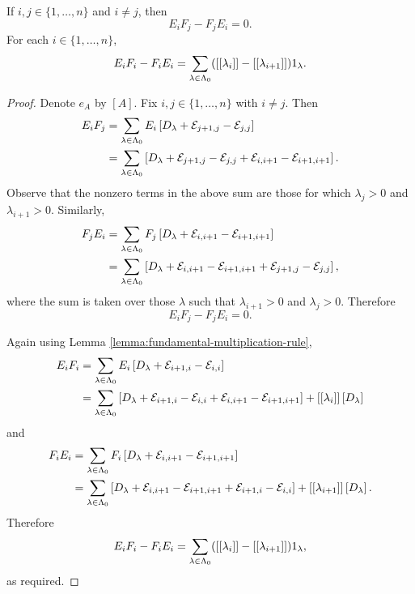 \documentclass[a4paper, 11pt]{report}
\begin{document}
\begin{lemma}\label{lemma:q-commutators-E-F}
If $i,j\in\{1,\ldots,n\}$ and $i\neq j$, then
\begin{equation*}
E_iF_j - F_jE_i = 0.
\end{equation*}
For each $i\in\{1,\ldots,n\}$,
\begin{equation*}
E_iF_i - F_iE_i = \sum_{\lambda\in\Lambda_0{}} ([[\lambda_i]] - [[\lambda_{i+1}]])1_\lambda.
\end{equation*}
\end{lemma}

\begin{proof}
Denote $e_A$ by $\left[A\right]$. Fix $i,j\in\{1,\ldots,n\}$ with $i\neq j$. Then
\begin{align*}
E_i F_j &= \sum_{\lambda\in\Lambda_0{}} E_i\left[D_\lambda +\mathcal{E}_{j+1,j} -\mathcal{E}_{j,j}\right]\\
&= \sum_{\lambda\in\Lambda_0{}} \left[D_\lambda +\mathcal{E}_{j+1,j} -\mathcal{E}_{j,j} +\mathcal{E}_{i,i+1} -\mathcal{E}_{i+1,i+1}\right].
\end{align*}
Observe that the nonzero terms in the above sum are those for which $\lambda_j>0$ and $\lambda_{i+1}>0$. Similarly,
\begin{align*}
F_jE_i &= \sum_{\lambda\in\Lambda_0{}} F_j\left[D_\lambda +\mathcal{E}_{i,i+1} -\mathcal{E}_{i+1,i+1}\right]\\
&= \sum_{\lambda\in\Lambda_0{}} \left[D_\lambda +\mathcal{E}_{i,i+1} -\mathcal{E}_{i+1,i+1} +\mathcal{E}_{j+1,j} -\mathcal{E}_{j,j}\right],
\end{align*}
where the sum is taken over those $\lambda$ such that $\lambda_{i+1}>0$ and $\lambda_{j}>0$. Therefore
\begin{equation*}
E_iF_j -F_jE_i = 0.
\end{equation*}

Again using Lemma \ref{lemma:fundamental-multiplication-rule},
\begin{align*}
E_iF_i &= \sum_{\lambda\in\Lambda_0{}} E_i\left[D_\lambda +\mathcal{E}_{i+1,i} -\mathcal{E}_{i,i}\right]\\
&= \sum_{\lambda\in\Lambda_0{}} \left[D_\lambda +\mathcal{E}_{i+1,i} -\mathcal{E}_{i,i} +\mathcal{E}_{i,i+1} -\mathcal{E}_{i+1,i+1}\right] + [[\lambda_i]]\left[D_\lambda\right]
\end{align*}
and
\begin{align*}
F_iE_i &= \sum_{\lambda\in\Lambda_0{}} F_i\left[D_\lambda +\mathcal{E}_{i,i+1} -\mathcal{E}_{i+1,i+1}\right]\\
&= \sum_{\lambda\in\Lambda_0{}} \left[D_\lambda +\mathcal{E}_{i,i+1} -\mathcal{E}_{i+1,i+1} +\mathcal{E}_{i+1,i} -\mathcal{E}_{i,i}\right] + [[\lambda_{i+1}]]\left[D_\lambda\right].
\end{align*}
Therefore
\begin{equation*}
E_iF_i -F_iE_i = \sum_{\lambda\in\Lambda_0{}} ([[\lambda_i]] -[[\lambda_{i+1}]])1_\lambda,
\end{equation*}
as required.
\end{proof}
\end{document}
